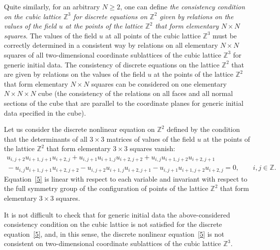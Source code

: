\documentclass[pdftex]{sigma}
\begin{document}
Quite similarly, for an arbitrary  $N \geq 2$, one can def\/ine {\it
the consistency condition on the cubic lattice $\mathbb{Z}^3$ for
discrete equations on $\mathbb{Z}^2$ given by relations on the
values of the field $u$ at the points of the lattice $\mathbb{Z}^2$
that form elementary $N \times N$ squares}. The values of the f\/ield
$u$ at all points of the cubic lattice $\mathbb{Z}^3$ must be
correctly determined in a consistent way by relations on all
elementary $N \times N$ squares of all two-dimensional coordinate
sublattices of the cubic lattice $\mathbb{Z}^3$ for generic initial
data. The consistency of discrete equations on the lattice
$\mathbb{Z}^2$ that are given by relations on the values of the
f\/ield $u$ at the points of the lattice $\mathbb{Z}^2$ that form
elementary $N \times N$ squares can be considered on one elementary
$N \times N \times N$ cube (the consistency of the relations on all
faces and all normal sections of the cube that are parallel to the
coordinate planes for generic initial data specif\/ied in the cube).


Let us consider the discrete nonlinear equation on
$\mathbb{Z}^2$ def\/ined by the condition that the determinants of all
$3 \times 3$ matrices of values of the f\/ield $u$ at the points of
the lattice $\mathbb{Z}^2$ that form elementary $3 \times 3$ squares
vanish:
\begin{gather}
u_{i, j + 2} u_{i + 1, j + 1} u_{i + 2, j} + u_{i, j
+ 1} u_{i + 1, j} u_{i + 2, j + 2} + u_{i, j} u_{i + 1, j +
2} u_{i + 2, j + 1}   \nonumber \\
{} - u_{i, j} u_{i + 1, j + 1} u_{i + 2, j + 2} - u_{i, j + 2} u_{i
+ 1, j} u_{i + 2, j + 1} - u_{i, j + 1} u_{i + 1, j + 2} u_{i + 2,
j} = 0, \qquad i, j \in \mathbb{Z}. \label{5}
\end{gather}
Equation~\eqref{5} is
linear with respect to each variable and invariant with respect to
the full symmetry group of the conf\/iguration of points of the
lattice $\mathbb{Z}^2$ that form elementary $3 \times 3$ squares.



It is not dif\/f\/icult to check that for generic initial data the
above-considered consistency condition on the cubic lattice is not
satisf\/ied for the discrete equation~\eqref{5}, and, in this sense,
the discrete nonlinear equation~\eqref{5} is not consistent on
two-dimensional coordinate sublattices of the cubic lattice
$\mathbb{Z}^3$.
\end{document}
